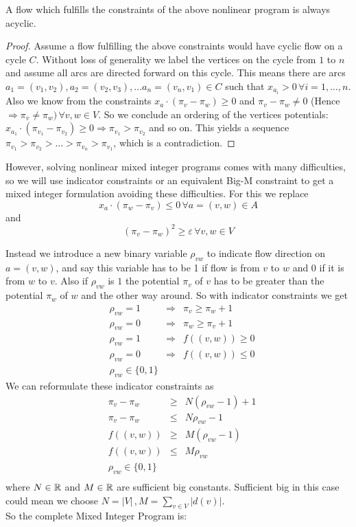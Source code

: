 \begin{prop}
 A flow which fulfills the constraints of the above nonlinear program is always acyclic.
\end{prop}
\begin{proof}
 Assume a flow fulfilling the above constraints would have cyclic flow on a cycle $C$. Without loss of generality 
we label the vertices on the cycle from $1$ to $n$ and assume all arcs are directed forward on this cycle. This means 
there are arcs $a_1=(v_1,v_2),a_2=(v_2,v_3), \dots a_n=(v_n, v_1)\in C$ such that $x_{a_i} > 0 \,\forall i={1,\dots , 
n}$. Also we know from the constraints  $x_a\cdot (\pi_v -\pi_w)\ge 0$ and $\pi_v - \pi_w \neq 0$ (Hence $\Rightarrow 
\pi_v\neq\pi_w)\, \forall v,w\in V$. So we conclude an ordering of the vertices potentials: $x_{a_1}\cdot (\pi_{v_1} 
-\pi_{v_2})\ge 0 \Rightarrow \pi_{v_1}>\pi_{v_2}$ and so on. This yields a sequence $\pi_{v_1}>\pi_{v_2}>\dots 
>\pi_{v_n}>\pi_{v_1}$, which is a contradiction. \Lightning
\end{proof}

However, solving nonlinear mixed integer programs comes with many difficulties, so we will use indicator constraints 
or an equivalent Big-M constraint to get a mixed integer formulation avoiding these difficulties. For this we  replace 
$$x_a\cdot (\pi_w -\pi_v)\le 0 \,\forall a=(v,w)\in A $$ and $$(\pi_v - \pi_w)^2 \ge \varepsilon \,\forall v,w \in V$$

Instead we introduce a new binary variable $\rho_{vw}$ to indicate flow direction on $a=(v,w)$, and say this variable 
has to be 1 if flow is from $v$ to $w$ and 0 if it is from $w$ to $v$. Also if $\rho_{vw}$ is $1$ the potential 
$\pi_v$ of $v$ has to be greater than the potential $\pi_w$ of $w$ and the other way around. So with indicator 
constraints we get
\begin{align*}
 &\rho_{vw}=1 &\Rightarrow &\pi_v\ge\pi_w +1\\
 &\rho_{vw}=0 &\Rightarrow &\pi_w\ge\pi_v +1\\
 &\rho_{vw}=1 &\Rightarrow &f((v,w))\ge 0\\
 &\rho_{vw}=0 &\Rightarrow &f((v,w))\le 0\\
 &\rho_{vw} \in \{0,1\}&&
\end{align*}
We can reformulate these indicator constraints as
\begin{align*}
 &\pi_v-\pi_w &\ge & N(\rho_{vw}-1)+1\\
 &\pi_v-\pi_w&\le &N\rho_{vw}-1 \\
 &f((v,w))&\ge& M(\rho_{vw}-1)\\
 &f((v,w))&\le & M\rho_{vw}\\
 &\rho_{vw} \in \{0,1\}&&\\
\end{align*}
where $N\in \mathbb{R}$ and $M\in \mathbb{R}$ are sufficient big constants. Sufficient big in this case could mean we choose 
$N=|V|\, ,M=\sum_{v\in V}|d(v)|$. \\
So the complete Mixed Integer Program is:

